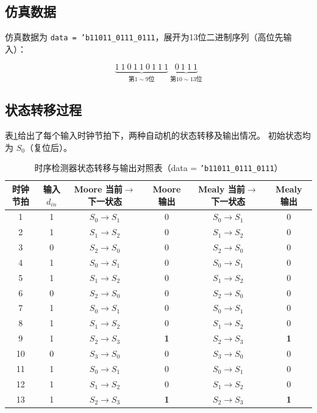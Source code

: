 \documentclass[12pt,a4paper]{article}
\begin{document}
\subsection{仿真数据}

仿真数据为 \texttt{data = 'b11011\_0111\_0111}，展开为13位二进制序列（高位先输入）：

\[
\underbrace{1\ 1\ 0\ 1\ 1\ 0\ 1\ 1\ 1}_{第1\sim9位}\ \underbrace{0\ 1\ 1\ 1}_{第10\sim13位}
\]

\subsection{状态转移过程}

表\ref{tab:state_trace}给出了每个输入时钟节拍下，两种自动机的状态转移及输出情况。
初始状态均为 $S_0$（复位后）。

\begin{table}[H]
\centering
\caption{时序检测器状态转移与输出对照表（data = \texttt{'b11011\_0111\_0111}）}
\label{tab:state_trace}
\begin{tabular}{cccccc}
\toprule
\textbf{时钟节拍} & \textbf{输入 $d_{in}$} &
\textbf{Moore 当前$\to$下一状态} & \textbf{Moore 输出} &
\textbf{Mealy 当前$\to$下一状态} & \textbf{Mealy 输出} \\
\midrule
 1  & 1 & $S_0 \to S_1$ & 0 & $S_0 \to S_1$ & 0 \\
 2  & 1 & $S_1 \to S_2$ & 0 & $S_1 \to S_2$ & 0 \\
 3  & 0 & $S_2 \to S_0$ & 0 & $S_2 \to S_0$ & 0 \\
 4  & 1 & $S_0 \to S_1$ & 0 & $S_0 \to S_1$ & 0 \\
 5  & 1 & $S_1 \to S_2$ & 0 & $S_1 \to S_2$ & 0 \\
 6  & 0 & $S_2 \to S_0$ & 0 & $S_2 \to S_0$ & 0 \\
 7  & 1 & $S_0 \to S_1$ & 0 & $S_0 \to S_1$ & 0 \\
 8  & 1 & $S_1 \to S_2$ & 0 & $S_1 \to S_2$ & 0 \\
 \rowcolor{yellow!30}
 9  & 1 & $S_2 \to S_3$ & \textbf{1} & $S_2 \to S_3$ & \textbf{1} \\
10  & 0 & $S_3 \to S_0$ & 0 & $S_3 \to S_0$ & 0 \\
11  & 1 & $S_0 \to S_1$ & 0 & $S_0 \to S_1$ & 0 \\
12  & 1 & $S_1 \to S_2$ & 0 & $S_1 \to S_2$ & 0 \\
 \rowcolor{yellow!30}
13  & 1 & $S_2 \to S_3$ & \textbf{1} & $S_2 \to S_3$ & \textbf{1} \\
\bottomrule
\end{tabular}
\end{table}
\end{document}
